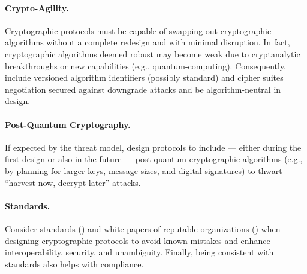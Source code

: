 \paragraph*{Crypto-Agility.} Cryptographic protocols must be capable of swapping out cryptographic algorithms without a complete redesign and with minimal disruption. In fact, cryptographic algorithms deemed robust may become weak due to cryptanalytic breakthroughs or new capabilities (e.g., quantum-computing).
Consequently, include versioned algorithm identifiers (possibly standard) and cipher suites negotiation secured against downgrade attacks \cite{chen_considerations_2025} and be algorithm-neutral in design. 


\paragraph*{Post-Quantum Cryptography.} If expected by the threat model, design protocols to include --- either during the first design or also in the future --- post-quantum cryptographic algorithms (e.g., by planning for larger keys, message sizes, and digital signatures) to thwart ``harvest now, decrypt later'' attacks.

\paragraph*{Standards.} Consider standards () and white papers of reputable organizations () when designing cryptographic protocols to avoid known mistakes and enhance interoperability, security, and unambiguity. Finally, being consistent with standards also helps with compliance.

